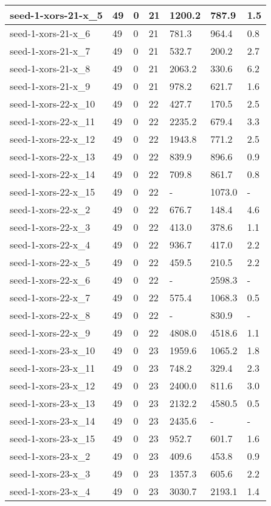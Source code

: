 \begin{scriptsize}
\begin{longtable}{|p{5cm}|l|l|l|l|l|l|}
seed-1-xors-21-x\_5&49&0&21&1200.2&787.9&1.5 \\ \hline 
seed-1-xors-21-x\_6&49&0&21&781.3&964.4&0.8 \\ \hline 
seed-1-xors-21-x\_7&49&0&21&532.7&200.2&2.7 \\ \hline 
seed-1-xors-21-x\_8&49&0&21&2063.2&330.6&6.2 \\ \hline 
seed-1-xors-21-x\_9&49&0&21&978.2&621.7&1.6 \\ \hline 
seed-1-xors-22-x\_10&49&0&22&427.7&170.5&2.5 \\ \hline 
seed-1-xors-22-x\_11&49&0&22&2235.2&679.4&3.3 \\ \hline 
seed-1-xors-22-x\_12&49&0&22&1943.8&771.2&2.5 \\ \hline 
seed-1-xors-22-x\_13&49&0&22&839.9&896.6&0.9 \\ \hline 
seed-1-xors-22-x\_14&49&0&22&709.8&861.7&0.8 \\ \hline 
seed-1-xors-22-x\_15&49&0&22&-&1073.0&- \\ \hline 
seed-1-xors-22-x\_2&49&0&22&676.7&148.4&4.6 \\ \hline 
seed-1-xors-22-x\_3&49&0&22&413.0&378.6&1.1 \\ \hline 
seed-1-xors-22-x\_4&49&0&22&936.7&417.0&2.2 \\ \hline 
seed-1-xors-22-x\_5&49&0&22&459.5&210.5&2.2 \\ \hline 
seed-1-xors-22-x\_6&49&0&22&-&2598.3&- \\ \hline 
seed-1-xors-22-x\_7&49&0&22&575.4&1068.3&0.5 \\ \hline 
seed-1-xors-22-x\_8&49&0&22&-&830.9&- \\ \hline 
seed-1-xors-22-x\_9&49&0&22&4808.0&4518.6&1.1 \\ \hline 
seed-1-xors-23-x\_10&49&0&23&1959.6&1065.2&1.8 \\ \hline 
seed-1-xors-23-x\_11&49&0&23&748.2&329.4&2.3 \\ \hline 
seed-1-xors-23-x\_12&49&0&23&2400.0&811.6&3.0 \\ \hline 
seed-1-xors-23-x\_13&49&0&23&2132.2&4580.5&0.5 \\ \hline 
seed-1-xors-23-x\_14&49&0&23&2435.6&-&- \\ \hline 
seed-1-xors-23-x\_15&49&0&23&952.7&601.7&1.6 \\ \hline 
seed-1-xors-23-x\_2&49&0&23&409.6&453.8&0.9 \\ \hline 
seed-1-xors-23-x\_3&49&0&23&1357.3&605.6&2.2 \\ \hline 
seed-1-xors-23-x\_4&49&0&23&3030.7&2193.1&1.4 \\ \hline 

\end{longtable}
\end{scriptsize}

